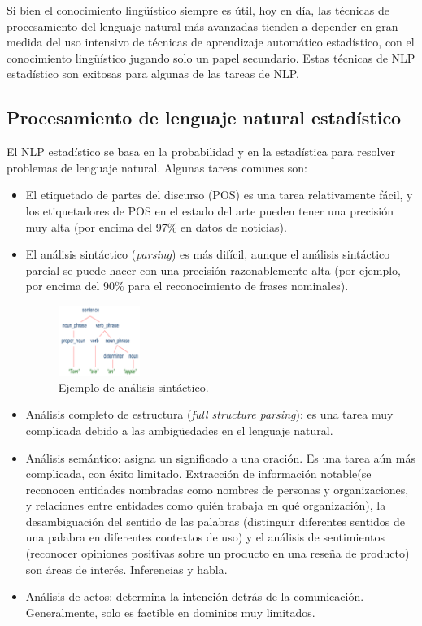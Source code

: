 Si bien el conocimiento lingüístico siempre es útil, hoy en día, las técnicas de procesamiento del lenguaje natural más avanzadas tienden a depender en gran medida del uso intensivo de técnicas de aprendizaje automático estadístico, con el conocimiento lingüístico jugando solo un papel secundario. Estas técnicas de NLP estadístico son exitosas para algunas de las tareas de NLP. 

\subsection{Procesamiento de lenguaje natural estadístico}

El NLP estadístico se basa en la probabilidad y en la estadística para resolver problemas de lenguaje natural. Algunas tareas comunes son:
\begin{itemize}
\item El etiquetado de partes del discurso (POS) es una tarea relativamente fácil, y los etiquetadores de POS en el estado del arte pueden tener una precisión muy alta (por encima del 97\% en datos de noticias).
\item El análisis sintáctico (\textit{parsing}) es más difícil, aunque el análisis sintáctico parcial se puede hacer con una precisión razonablemente alta (por ejemplo, por encima del 90\% para el reconocimiento de frases nominales).
\begin{figure}[H]
\centering
\includegraphics[width=0.25\textwidth]{fotos/3.png}
\caption{Ejemplo de análisis sintáctico.}
\label{fig:3}
\end{figure}
\item Análisis completo de estructura (\textit{full structure parsing}): es una tarea muy complicada debido a las ambigüedades en el lenguaje natural.
\item Análisis semántico: asigna un significado a una oración. Es una tarea aún más complicada, con éxito limitado. Extracción de información notable(se reconocen entidades nombradas como nombres de personas y organizaciones, y relaciones entre entidades como quién trabaja en qué organización), la desambiguación del sentido de las palabras (distinguir diferentes sentidos de una palabra en diferentes contextos de uso) y el análisis de sentimientos (reconocer opiniones positivas sobre un producto en una reseña de producto) son áreas de interés. Inferencias y habla.
\item Análisis de actos: determina la intención detrás de la comunicación. Generalmente, solo es factible en dominios muy limitados.
\end{itemize}

